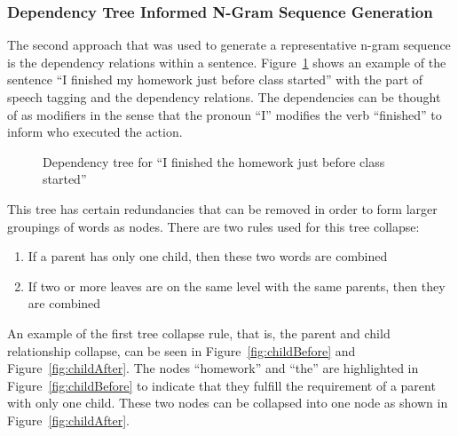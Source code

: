 \documentclass{article}[10]
\begin{document}
\subsubsection{Dependency Tree Informed N-Gram Sequence Generation\label{sec:dependency}}

The second approach that was used to generate a representative n-gram
sequence is the dependency relations within a sentence.
Figure~\ref{fig:dep} shows an example of the sentence
``I finished my homework just before class started'' with the part of
speech tagging and the dependency relations. The dependencies can be
thought of as modifiers in the sense that the pronoun ``I'' modifies the
verb ``finished'' to inform who executed the action.

\begin{figure}[H]
  \begin{center}
    \caption{Dependency tree for ``I finished the homework just before class
      started''\label{fig:dep}}
  \end{center}
\end{figure}

This tree has certain redundancies that can be removed in order to form
larger groupings of words as nodes. There are two rules used for this
tree collapse:

\begin{enumerate}[label=(\arabic*)]
    \item{If a parent has only one child, then these two words are combined}
    \item{If two or more leaves are on the same level with the same parents, then they are combined}
\end{enumerate}

An example of the first tree collapse rule, that is, the parent and
child relationship collapse, can be seen in
Figure~\ref{fig:childBefore} and Figure~\ref{fig:childAfter}. The nodes ``homework'' and
``the'' are highlighted in Figure~\ref{fig:childBefore} to
indicate that they fulfill the requirement of a parent with only one
child. These two nodes can be collapsed into one node as shown in
Figure~\ref{fig:childAfter}.
\end{document}
